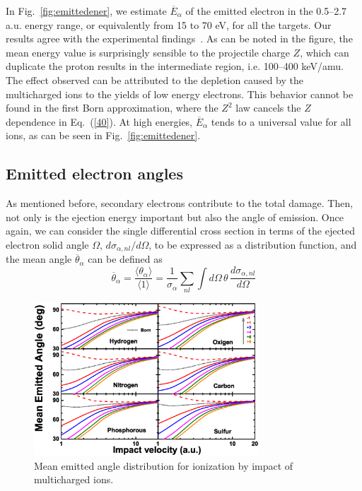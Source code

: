 \documentclass[preprint]{revtex4-2}
\begin{document}
In Fig.~\ref{fig:emittedener}, we estimate $\overline{E}_{\alpha}$ of
the emitted electron in the 0.5--2.7 a.u. energy range, or equivalently 
from 15 to 70 eV, for all the targets. Our results agree with the 
experimental findings~\cite{surdutovic2018}. As can be noted in the 
figure, the mean energy value is surprisingly sensible to the 
projectile charge $Z$, which can duplicate the proton results in the 
intermediate region, i.e. 100--400 keV/amu. The effect observed can be 
attributed to the depletion caused by the multicharged ions to the 
yields of low energy electrons. This behavior cannot be found in the 
first Born approximation, where the $Z^2$ law cancels the $Z$ dependence
in Eq.~(\ref{40}). At high energies, $\overline{E}_{\alpha}$ tends to a 
universal value for all ions, as can be seen in Fig.~\ref{fig:emittedener}.


\subsection{Emitted electron angles}
\label{subsec:meanang}

As mentioned before, secondary electrons contribute to the total damage. 
Then, not only is the ejection energy important but also the angle 
of emission. Once again, we can consider the single differential cross 
section in terms of the ejected electron solid angle $\Omega$, 
$d\sigma_{\alpha,nl}/d\Omega$, to be expressed as a distribution function, 
and the mean angle $\overline{\theta}_{\alpha}$ can be defined as
\begin{equation}
\overline{\theta}_{\alpha}=\frac{\langle\theta_{\alpha}\rangle}
{\langle 1\rangle}=\frac{1}{\sigma_{\alpha}}\sum\limits_{nl}
\int d\Omega\,\theta\,\frac{d\sigma_{\alpha,nl}}{d\Omega}
\end{equation}

\begin{figure}[t!]
\centering
\includegraphics[width=0.75\textwidth]{figuras/Fig_finales/fig6.eps}
\caption{Mean emitted angle distribution for ionization by impact of
multicharged ions.}
\label{fig:emittedang}
\end{figure} 
\end{document}
